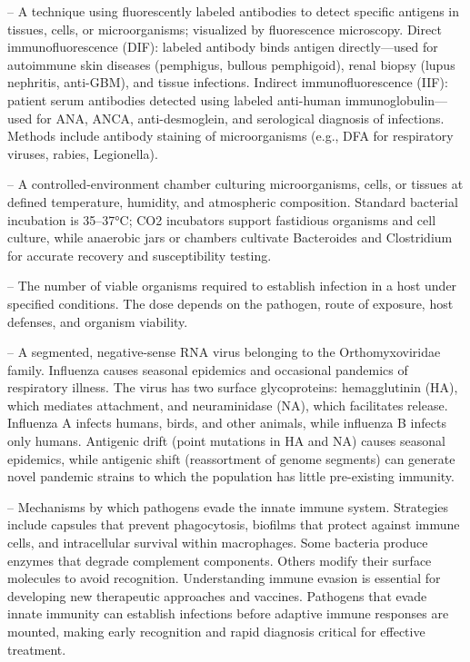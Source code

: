 -- A technique using fluorescently labeled antibodies to detect specific antigens in tissues, cells, or microorganisms; visualized by fluorescence microscopy. Direct immunofluorescence (DIF): labeled antibody binds antigen directly—used for autoimmune skin diseases (pemphigus, bullous pemphigoid), renal biopsy (lupus nephritis, anti-GBM), and tissue infections. Indirect immunofluorescence (IIF): patient serum antibodies detected using labeled anti-human immunoglobulin—used for ANA, ANCA, anti-desmoglein, and serological diagnosis of infections. Methods include antibody staining of microorganisms (e.g., DFA for respiratory viruses, rabies, Legionella).

-- A controlled-environment chamber culturing microorganisms, cells, or tissues at defined temperature, humidity, and atmospheric composition. Standard bacterial incubation is 35--37°C; CO2 incubators support fastidious organisms and cell culture, while anaerobic jars or chambers cultivate Bacteroides and Clostridium for accurate recovery and susceptibility testing.

-- The number of viable organisms required to establish infection in a host under specified conditions. The dose depends on the pathogen, route of exposure, host defenses, and organism viability.

-- A segmented, negative-sense RNA virus belonging to the Orthomyxoviridae family. Influenza causes seasonal epidemics and occasional pandemics of respiratory illness. The virus has two surface glycoproteins: hemagglutinin (HA), which mediates attachment, and neuraminidase (NA), which facilitates release. Influenza A infects humans, birds, and other animals, while influenza B infects only humans. Antigenic drift (point mutations in HA and NA) causes seasonal epidemics, while antigenic shift (reassortment of genome segments) can generate novel pandemic strains to which the population has little pre-existing immunity.

-- Mechanisms by which pathogens evade the innate immune system. Strategies include capsules that prevent phagocytosis, biofilms that protect against immune cells, and intracellular survival within macrophages. Some bacteria produce enzymes that degrade complement components. Others modify their surface molecules to avoid recognition. Understanding immune evasion is essential for developing new therapeutic approaches and vaccines. Pathogens that evade innate immunity can establish infections before adaptive immune responses are mounted, making early recognition and rapid diagnosis critical for effective treatment.

